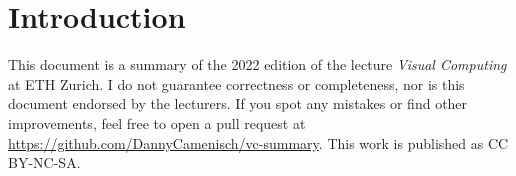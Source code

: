 \section{Introduction}

This document is a summary of the 2022 edition of the lecture \textit{Visual Computing} at ETH Zurich. I do not guarantee correctness or completeness, nor is this document endorsed by the lecturers. If you spot any mistakes or find other improvements, feel free to open a pull request at \url{https://github.com/DannyCamenisch/vc-summary}. This work is published as CC BY-NC-SA.
\begin{center}
	\ccbyncsa
\end{center}
